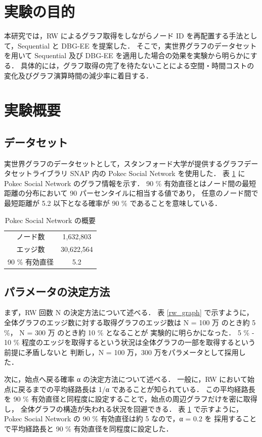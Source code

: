 \section{実験の目的}
本研究では，RW によるグラフ取得をしながらノード ID を再配置する手法として，Sequential と DBG-EE を提案した．
そこで，実世界グラフのデータセットを用いて Sequential 及び DBG-EE を適用した場合の効果を実験から明らかにする．
具体的には，グラフ取得の完了を待たないことによる空間・時間コストの変化及びグラフ演算時間の減少率に着目する．
\section{実験概要}
\subsection{データセット}
実世界グラフのデータセットとして，スタンフォード大学が提供するグラフデータセットライブラリ SNAP \cite{snapnets} 内の 
Pokec Social Network \cite{takac2012data} を使用した．
表 \ref{dataset} に Pokec Social Network のグラフ情報を示す．
90 \% 有効直径とはノード間の最短距離の分布において 90 パーセンタイルに相当する値であり，
任意のノード間で最短距離が 5.2 以下となる確率が 90 \% であることを意味している．
\begin{table}[t]
  \begin{center}
    \caption{Pokec Social Network の概要}
    \begin{tabular}{cc} \toprule
      ノード数 & 1,632,803 \\
      エッジ数 & 30,622,564 \\
      90 \% 有効直径 & 5.2 \\ \bottomrule
    \end{tabular}
    \label{dataset}
  \end{center}
\end{table}

\subsection{パラメータの決定方法}
まず，RW 回数 N の決定方法について述べる．
表 \ref{rw_graph} で示すように，全体グラフのエッジ数に対する取得グラフのエッジ数は N = 100 万 のとき約 5 \%， N = 300 万 のとき約 10 \% となることが
実験的に明らかになった．
5 \% - 10 \% 程度のエッジを取得するという状況は全体グラフの一部を取得するという前提に矛盾しないと
判断し，N = 100 万，300 万をパラメータとして採用した．

次に，始点へ戻る確率 α の決定方法について述べる．
一般に，RW において始点に戻るまでの平均経路長は 1/α であることが知られている．
この平均経路長を 90 \% 有効直径と同程度に設定することで，始点の周辺グラフだけを密に取得し，
全体グラフの構造が失われる状況を回避できる．
表 \ref{dataset} で示すように，Pokec Social Network の 90 \% 有効直径は約 5 なので，α = 0.2 を
採用することで平均経路長と 90 \% 有効直径を同程度に設定した． 

